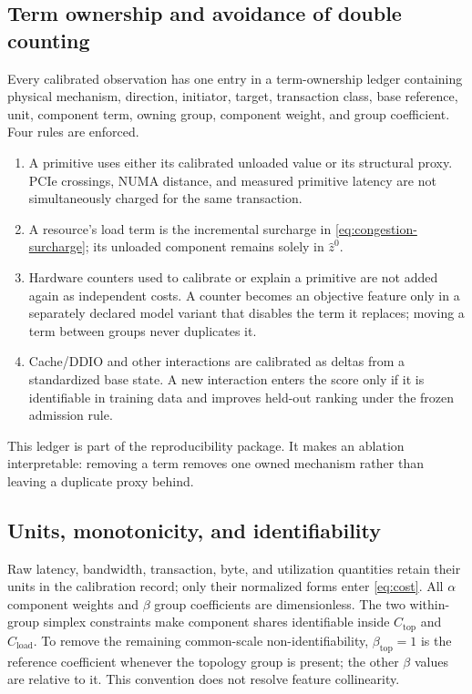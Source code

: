 \subsection{Term ownership and avoidance of double counting}

Every calibrated observation has one entry in a term-ownership ledger containing physical mechanism, direction, initiator, target, transaction class, base reference, unit, component term, owning group, component weight, and group coefficient. Four rules are enforced.

\begin{enumerate}[leftmargin=*,itemsep=2pt]
  \item A primitive uses either its calibrated unloaded value or its structural proxy. PCIe crossings, NUMA distance, and measured primitive latency are not simultaneously charged for the same transaction.
  \item A resource's load term is the incremental surcharge in \cref{eq:congestion-surcharge}; its unloaded component remains solely in $\widehat z^0$.
  \item Hardware counters used to calibrate or explain a primitive are not added again as independent costs. A counter becomes an objective feature only in a separately declared model variant that disables the term it replaces; moving a term between groups never duplicates it.
  \item Cache/DDIO and other interactions are calibrated as deltas from a standardized base state. A new interaction enters the score only if it is identifiable in training data and improves held-out ranking under the frozen admission rule.
\end{enumerate}

This ledger is part of the reproducibility package. It makes an ablation interpretable: removing a term removes one owned mechanism rather than leaving a duplicate proxy behind.

\subsection{Units, monotonicity, and identifiability}

Raw latency, bandwidth, transaction, byte, and utilization quantities retain their units in the calibration record; only their normalized forms enter \cref{eq:cost}. All $\alpha$ component weights and $\beta$ group coefficients are dimensionless. The two within-group simplex constraints make component shares identifiable inside $C_{\mathrm{top}}$ and $C_{\mathrm{load}}$. To remove the remaining common-scale non-identifiability, $\beta_{\mathrm{top}}=1$ is the reference coefficient whenever the topology group is present; the other $\beta$ values are relative to it. This convention does not resolve feature collinearity.

